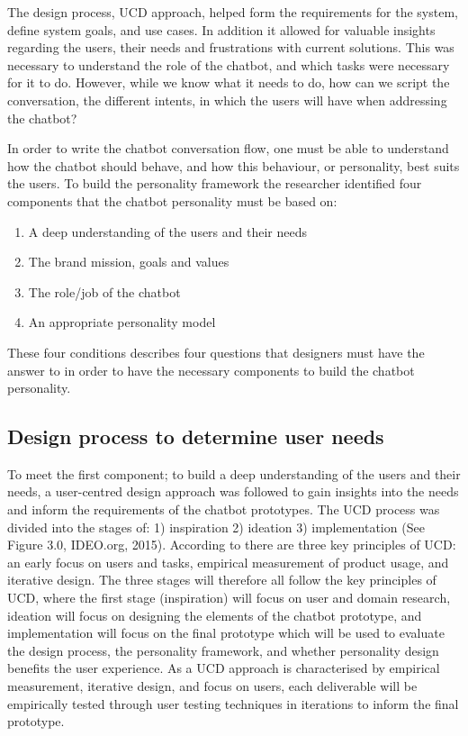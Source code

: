 The design process, UCD approach, helped form the requirements for the system, define system goals, and use cases. In addition it allowed for valuable insights regarding the users, their needs and frustrations with current solutions. This was necessary to understand the role of the chatbot, and which tasks were necessary for it to do. However, while we know what it needs to do, how can we script the conversation, the different intents, in which the users will have when addressing the chatbot? 

In order to write the chatbot conversation flow, one must be able to understand how the chatbot should behave, and how this behaviour, or personality, best suits the users. To build the personality framework the researcher identified four components that the chatbot personality must be based on:

\begin{enumerate}
    \item A deep understanding of the users and their needs %
    \item The brand mission, goals and values
    \item The role/job of the chatbot
    \item An appropriate personality model
\end{enumerate}

These four conditions describes four questions that designers must have the answer to in order to have the necessary components to build the chatbot personality.

\vspace{5mm} %

\subsection{Design process to determine user needs}

To meet the first component; to build a deep understanding of the users and their needs, a user-centred design approach was followed to gain insights into the needs and inform the requirements of the chatbot prototypes. The UCD process was divided into the stages of:  1) inspiration 2) ideation 3) implementation (See Figure 3.0, IDEO.org, 2015). According to \cite{Gould1985} there are three key principles of UCD: an early focus on users and tasks, empirical measurement of product usage, and iterative design. The three stages will therefore all follow the key principles of UCD, where the first stage (inspiration) will focus on user and domain research, ideation will focus on designing the elements of the chatbot prototype, and implementation will focus on the final prototype which will be used to evaluate the design process, the personality framework, and whether personality design benefits the user experience. As a UCD approach is characterised by empirical measurement, iterative design, and focus on users, each deliverable will be empirically tested through user testing techniques in iterations to inform the final prototype.

